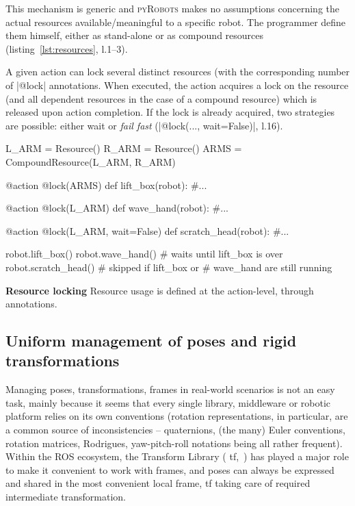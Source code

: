 \documentclass[a4paper, 10pt, conference]{ieeeconf}      %
\newcommand{\pyRobots}{\textsc{pyRobots}}
\begin{document}
This mechanism is generic and \pyRobots{} makes no assumptions concerning the
actual resources available/meaningful to a specific robot. The
programmer define them himself, either as stand-alone or as compound
resources (listing~\ref{lst:resources}, l.1--3).

A given action can lock several distinct resources (with the corresponding
number of \python|@lock| annotations. When executed, the
action acquires a lock on the resource (and all dependent resources in the case
of a compound resource) which is released upon action completion. If the lock is
already acquired, two strategies are possible: either wait or \emph{fail fast}
(\python|@lock(..., wait=False)|, l.16).

\begin{listing}
\begin{pythoncode}
    L_ARM = Resource()
    R_ARM = Resource()
    ARMS = CompoundResource(L_ARM, R_ARM)

    @action
    @lock(ARMS)
    def lift_box(robot):
        #...

    @action
    @lock(L_ARM)
    def wave_hand(robot):
        #...

    @action
    @lock(L_ARM, wait=False)
    def scratch_head(robot):
        #...

    robot.lift_box()
    robot.wave_hand() # waits until lift_box is over
    robot.scratch_head() # skipped if lift_box or
                         # wave_hand are still running

\end{pythoncode}
\caption{\textbf{Resource locking} Resource usage is defined at the
action-level, through annotations.}

\label{lst:resources}
\end{listing}



\subsection{Uniform management of poses and rigid transformations}

Managing poses, transformations, frames in real-world scenarios is not an easy
task, mainly because it seems that every single library, middleware or robotic
platform relies on its own conventions (rotation representations, in particular,
are a common source of inconsistencies -- quaternions, (the many) Euler
conventions, rotation matrices, Rodrigues, yaw-pitch-roll notations being all
rather frequent). Within the ROS ecosystem, the Transform Library ({\sc
tf},~\cite{foote2013tf}) has played a major role to make it convenient to work
with frames, and poses can always be expressed and shared in the most convenient
local frame, {\sc tf} taking care of required intermediate transformation.
\end{document}
